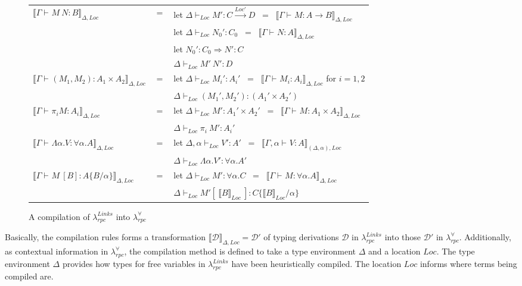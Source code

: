 \documentclass[a4paper]{article}
\theoremstyle{plain}
\theoremstyle{definition}
\newcommand{\rulewidth}{.8\linewidth}
\newcommand{\ruleverticalsephalf}{0.25cm}
\newcommand{\ruleverticalsep}{0.5cm}
\newcommand{\polyrpc}{$\lambda_{rpc}^{\forall}$\xspace}
\newcommand{\linksrpc}{$\lambda_{rpc}^{Links}$\xspace}
\newcommand{\subst}[2]{\{#1/#2\}}
\newcommand{\funL}[1]{\xrightarrow{#1}}
\newcommand{\tyenv}{\Gamma}
\newcommand{\typing}[4]{#1\vdash_{#2} #3 : #4}
\newcommand{\linkstycomp}[2]{\llbracket#1\rrbracket_{#2}}
\newcommand{\adjcomp}[4]{#1:#2 \Rightarrow #3:#4}
\newcommand{\judgcomp}[2]{\llbracket#1\rrbracket_{#2}}
\newcommand{\Loc}{Loc}
\begin{document}
\begin{figure}[h]
\begin{tabular}{l c p{\rulewidth}}
  \\[\ruleverticalsephalf]
%
  $\judgcomp{ \typing{\tyenv}{}{M \ N }{B} }{\Delta,\Loc}$ & $=$
  & let $\typing{\Delta}{\Loc}{M'}{C \funL{\Loc'} D}$
    \ = \ $\judgcomp{ \typing{\tyenv}{}{M}{A \rightarrow B} }{\Delta,\Loc}$
  \\[\ruleverticalsephalf]
  &
  & let $\typing{\Delta}{\Loc}{N_0'}{C_0}$
    \ = \ $\judgcomp{ \typing{\tyenv}{}{N}{A} }{\Delta,\Loc}$
  \\[\ruleverticalsephalf]
  &
  & let $\adjcomp{N_0'}{C_0}{N'}{C}$
  \\[\ruleverticalsephalf]
  &
  & $\typing{\Delta}{\Loc}{M' \ N'}{D}$
  \\[\ruleverticalsep]
%
  $\judgcomp{ \typing{\tyenv}{}{(M_1,M_2)}{A_1\times A_2} }{\Delta,\Loc}$ & $=$
  & let $\typing{\Delta}{\Loc}{M_i'}{A_i'}$
    \ = \ $\judgcomp{ \typing{\tyenv}{}{M_i}{A_i} }{\Delta,\Loc}$ for $i=1,2$
  \\[\ruleverticalsephalf]
  &
  & $\typing{\Delta}{\Loc}{(M_1',M_2')}{(A_1' \times A_2')}$
  \\[\ruleverticalsep]
%
  $\judgcomp{ \typing{\tyenv}{}{\pi_i M}{A_i} }{\Delta,\Loc}$ & $=$
  & let $\typing{\Delta}{\Loc}{M'}{A_1' \times A_2'}$
    \ = \ $\judgcomp{ \typing{\tyenv}{}{M}{A_1\times A_2} }{\Delta,\Loc}$
  \\[\ruleverticalsephalf]
  &
  & $\typing{\Delta}{\Loc}{\pi_i \ M'}{A_i'}$
  \\[\ruleverticalsep]
%
  $\judgcomp{ \typing{\tyenv}{}{\Lambda\alpha.V}{\forall\alpha.A} }{\Delta,\Loc}$ & $=$
  & let $\typing{\Delta,\alpha}{\Loc}{V'}{A'}$
    \ = \ $\judgcomp{ \typing{\tyenv,\alpha}{}{V}{A} }{(\Delta,\alpha),\Loc}$
  \\[\ruleverticalsephalf]
  &
  & $\typing{\Delta}{\Loc}{\Lambda\alpha.V'}{\forall\alpha.A'}$
  \\[\ruleverticalsep]
%
  $\judgcomp{ \typing{\tyenv}{}{M \ [B]}{A\subst{B}{\alpha}} }{\Delta,\Loc}$ & $=$
  & let $\typing{\Delta}{\Loc}{M'}{\forall\alpha.C}$
    \ = \ $\judgcomp{ \typing{\tyenv}{}{M}{\forall\alpha.A} }{\Delta,\Loc}$
  \\[\ruleverticalsephalf]
  &
  & $\typing{\Delta}{\Loc}{M'[ \ \linkstycomp{B}{\Loc} \ ]}{C\subst{ \linkstycomp{B}{\Loc} }{\alpha}}$
  \\[\ruleverticalsep]
\end{tabular}
\caption{A compilation of \linksrpc into \polyrpc}
\label{fig:compilationoflinksrpc}
\end{figure}


%
Basically, the compilation rules forms a transformation
$\judgcomp{\mathcal{D}}{\Delta,\Loc}=\mathcal{D'}$ of typing derivations
$\mathcal{D}$ in \linksrpc into those $\mathcal{D'}$ in \polyrpc.
%
Additionally, as contextual information in \polyrpc, the
compilation method is defined to take a type environment $\Delta$ and a
location $\Loc$.
%
The type environment $\Delta$ provides how types for free variables in
\linksrpc have been heuristically compiled.
%
The location $\Loc$ informs where terms being compiled are.
\end{document}
